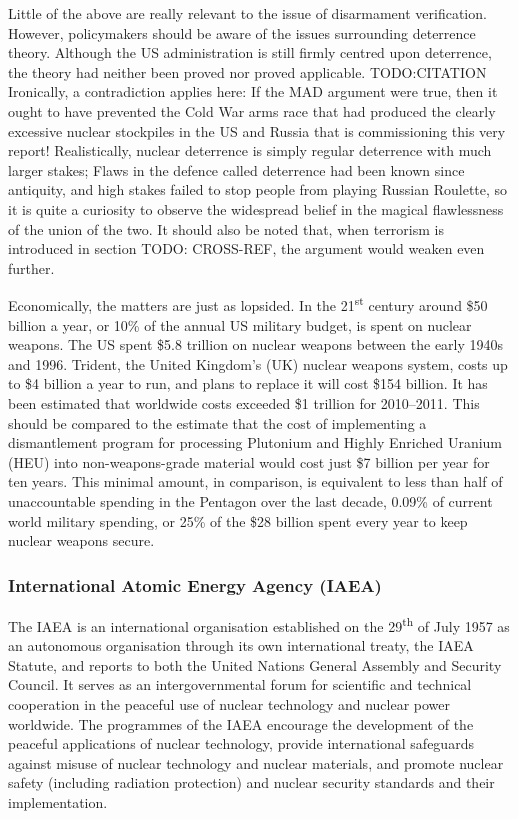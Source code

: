 \documentclass[twoside,titlepage,11pt,twocolumn,a4paper]{article}
\begin{document}
Little of the above are really relevant to the issue of disarmament
verification. However, policymakers should be aware of the issues
surrounding deterrence theory. Although the US administration is still
firmly centred upon deterrence, the theory had neither been proved nor
proved applicable. TODO:CITATION Ironically, a contradiction applies
here: If the MAD argument were true, then it ought to have prevented
the Cold War arms race that had produced the clearly excessive nuclear
stockpiles in the US and Russia that is commissioning this very
report! Realistically, nuclear deterrence is simply regular deterrence
with much larger stakes; Flaws in the defence called deterrence had
been known since antiquity, and high stakes failed to stop people from
playing Russian Roulette, so it is quite a curiosity to observe the
widespread belief in the magical flawlessness of the union of the two.
It should also be noted that, when terrorism is introduced in section
TODO: CROSS-REF, the argument would weaken even further. 

Economically, the matters are just as lopsided. In the
21\textsuperscript{st} century around \$50 billion a year, or 10\%
of the annual US military budget, is spent on nuclear
weapons. \citep{USspending} The US spent \$5.8 trillion on nuclear
weapons between the early 1940s and 1996. Trident, the United
Kingdom's (UK) nuclear weapons system, costs up to \$4 billion a
year to run, and plans to replace it will cost \$154 billion. It has
been estimated that worldwide costs exceeded \$1 trillion for
2010--2011. \citep{worldSpending} This should be compared to the
estimate that the cost of implementing a dismantlement program for
processing Plutonium and Highly Enriched Uranium (HEU) into
non-weapons-grade material would cost just \$7 billion per year for
ten years. \citep{worldSafe} This minimal amount, in comparison, is
equivalent to less than half of unaccountable spending in the Pentagon
over the last decade, 0.09\% of current world military spending, or
25\% of the \$28 billion spent every year to keep nuclear weapons
secure.

\subsubsection{International Atomic Energy Agency (IAEA)}
The IAEA is an international organisation established on the
29\textsuperscript{th} of July 1957 as an autonomous organisation
through its own international treaty, the IAEA Statute, and reports to
both the United Nations General Assembly and Security Council. It
serves as an intergovernmental forum for scientific and technical
cooperation in the peaceful use of nuclear technology and nuclear
power worldwide. The programmes of the IAEA encourage the development
of the peaceful applications of nuclear technology, provide
international safeguards against misuse of nuclear technology and
nuclear materials, and promote nuclear safety (including radiation
protection) and nuclear security standards and their implementation.
\end{document}
